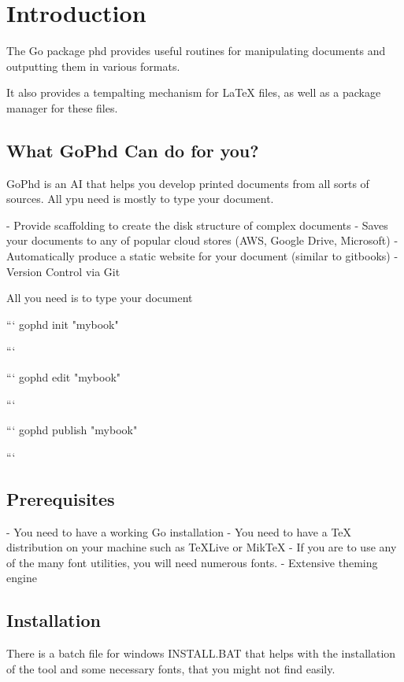 \chapter{Introduction}

The Go package phd provides useful routines for manipulating documents and outputting them in
various formats. 

It also provides a tempalting mechanism for LaTeX files, as well as a package manager for these 
files.

\section{What GoPhd Can do for you?}

GoPhd is an AI that helps you develop printed documents from all sorts of sources. All ypu need is mostly
to type your document.

- Provide scaffolding to create the disk structure of complex documents
- Saves your documents to any of popular cloud stores (AWS, Google Drive, Microsoft)
- Automatically produce a static website for your document (similar to gitbooks)
- Version Control via Git

All you need is to type your document

```
gophd init "mybook"

```

```
gophd edit "mybook"

```

```
gophd publish "mybook"

```



\section{Prerequisites}

- You need to have a working Go installation
- You need to have a TeX distribution on your machine such as TeXLive or MikTeX
- If you are to use any of the many font utilities, you will need numerous fonts.
- Extensive theming engine

\section{Installation}

There is a batch file for windows INSTALL.BAT that helps with the installation of the tool and some necessary fonts, that you might not find easily.

